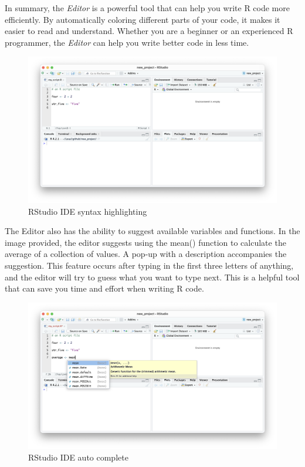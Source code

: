 \documentclass[
]{book}
\begin{document}
In summary, the \emph{Editor} is a powerful tool that can help you write R code more efficiently. By automatically coloring different parts of your code, it makes it easier to read and understand. Whether you are a beginner or an experienced R programmer, the \emph{Editor} can help you write better code in less time.

\begin{figure}
\includegraphics[width=31.94in]{images/02_022_editor_highlighting} \caption{\label{fig:2022}RStudio IDE syntax highlighting}\label{fig:2022}
\end{figure}

The Editor also has the ability to suggest available variables and functions. In the image provided, the editor suggests using the mean() function to calculate the average of a collection of values. A pop-up with a description accompanies the suggestion. This feature occurs after typing in the first three letters of anything, and the editor will try to guess what you want to type next. This is a helpful tool that can save you time and effort when writing R code.

\begin{figure}
\includegraphics[width=31.94in]{images/02_023_editor_autocomplete} \caption{\label{fig:2023}RStudio IDE auto complete}\label{fig:2023}
\end{figure}
\end{document}
